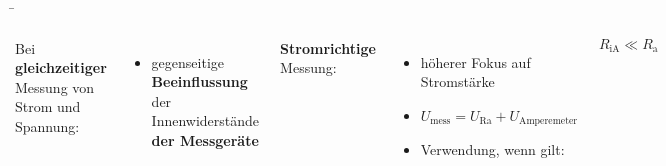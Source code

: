 \begin{frame}
{	}

	\b{

		\begin{columns}
		 Bei \textbf{gleichzeitiger} Messung von Strom und Spannung:
		 \begin{itemize}
			\item gegenseitige \textbf{Beeinflussung} der Innenwiderstände \textbf{der Messgeräte}
		 \end{itemize}


		 \vspace{5pt}
			
		 \textbf{Stromrichtige} Messung:

		 \begin{itemize}
			\item höherer Fokus auf Stromstärke
			\item $U_\mathrm{mess} = U_\mathrm{Ra} + U_\mathrm{Amperemeter}$ 
			\item Verwendung, wenn gilt:
		\end{itemize}
		
		\begin{equation*}
			R_{\mathrm{iA}} \ll R_{\mathrm{a}}
		\end{equation*}

	

 
 


\end{columns}}
\end{frame}
